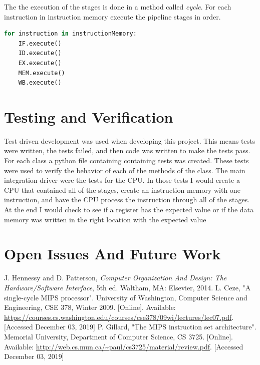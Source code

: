 \documentclass[conference]{IEEEtran}
\begin{document}
The the execution of the stages is done in a method called \textit{cycle}.  For each instruction in instruction memory execute the pipeline stages in order.

\begin{lstlisting}[language=Python]
for instruction in instructionMemory:
    IF.execute()
    ID.execute()
    EX.execute()
    MEM.execute()
    WB.execute()
\end{lstlisting}

\section{Testing and Verification}
Test driven development was used when developing this project.  This means tests were written, the tests failed, and then code was written to make the tests pass.  For each class a python file containing containing tests was created.  These tests were used to verify the behavior of each of the methods of the class.
The main integration driver were the tests for the CPU.  In those tests I would create a CPU that contained all of the stages, create an instruction memory with one instruction, and have the CPU process the instruction through all of the stages.  At the end I would check to see if a register has the expected value or if the data memory was written in the right location with the expected value 

\section{Open Issues And Future Work}

\begin{thebibliography}{00}
 J. Hennessy and D. Patterson, \textit{Computer Organization And Design: The Hardware/Software Interface}, 5th ed. Waltham, MA: Elsevier, 2014.
 L. Ceze, "A single-cycle MIPS processor". University of Washington, Computer Science and Engineering, CSE 378, Winter 2009. [Online]. Available: \url{https://courses.cs.washington.edu/courses/cse378/09wi/lectures/lec07.pdf}. [Accessed December 03, 2019]
 P. Gillard, "The MIPS instruction set architecture". Memorial University, Department of Computer Science, CS 3725. [Online]. Available: \url{http://web.cs.mun.ca/~paul/cs3725/material/review.pdf}. [Accessed December 03, 2019]
\end{thebibliography}
\end{document}
